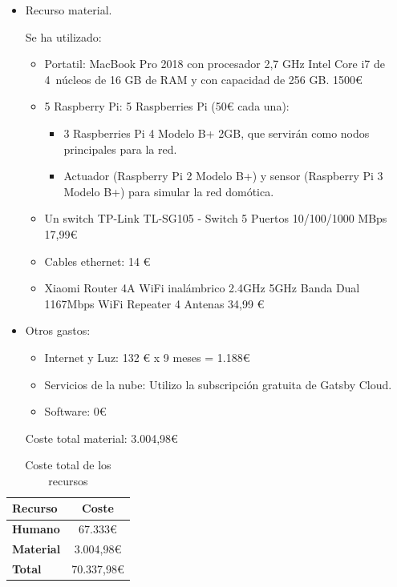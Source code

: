 \begin{itemize}
  \item Recurso material.

  Se ha utilizado: 
  
  \begin{itemize}
    \item Portatil: MacBook Pro 2018 con procesador 2,7 GHz Intel Core i7 de 4 núcleos de 
    16 GB de RAM y con capacidad de 256 GB. 1500€
    \item 5 Raspberry Pi: 
    5 Raspberries Pi (50€ cada una):
    \begin{itemize}
      \item 3 Raspberries Pi 4 Modelo B+ 2GB, que servirán como nodos principales para la red.
      \item Actuador (Raspberry Pi 2 Modelo B+) y sensor (Raspberry Pi 3 Modelo B+) para simular la red domótica.
    \end{itemize}
    \item Un switch TP-Link TL-SG105 - Switch 5 Puertos 10/100/1000 MBps 17,99€
    \item Cables ethernet: 14 €
    \item Xiaomi Router 4A WiFi inalámbrico 2.4GHz 5GHz Banda Dual 1167Mbps WiFi Repeater 4 Antenas 34,99 €
  \end{itemize}
  
  \item Otros gastos:
  \begin{itemize}
    \item Internet y Luz: 132 € x 9 meses = 1.188€
    \item Servicios de la nube: Utilizo la subscripción gratuita de Gatsby Cloud.
    \item Software: 0€
  \end{itemize}

  Coste total material: 3.004,98€
\end{itemize}

\begin{table}[h!]
  \centering
  \begin{tabular}{|l|c|}
      \hline
      \textbf{Recurso}  &   \textbf{Coste} \\
      \hline
      \hline 
      \textbf{Humano}   &   67.333€ \\ 
      \hline 
      \textbf{Material} &   3.004,98€\\ 
      \hline
      \textbf{Total}    &   70.337,98€\\ 
      \hline
  \end{tabular}
  
  \caption{Coste total de los recursos}
  \label{table:coste-recursos}
\end{table}

\newpage